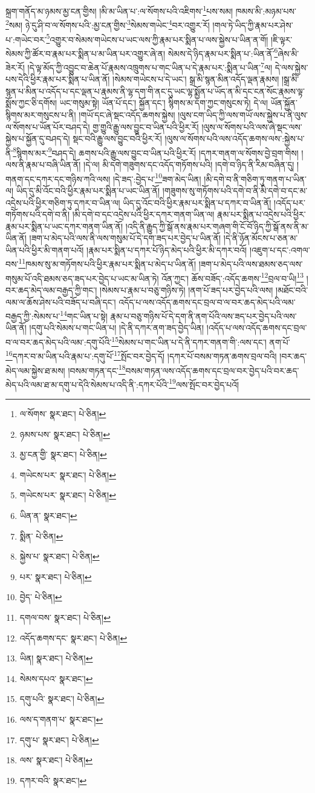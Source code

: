 སྐྲག་གནོད་མ་ཉམས་མྱ་ངན་གྱིས། །མི་མ་ཡིན་པ་:ལ་སོགས་པའི་འཇིགས་\footnote{ལ་སོགས་  སྣར་ཐང་།  པེ་ཅིན། }པས་སམ། ཁམས་མི་:མཉམ་པས་\footnote{ཉམས་པས་  སྣར་ཐང་།  པེ་ཅིན། }སམ། ཉེ་དུ་ཤི་བ་ལ་སོགས་པའི་:མྱ་ངན་གྱིས་\footnote{མྱ་ངན་གྱི་  སྣར་ཐང་།  པེ་ཅིན། }སེམས་གཡེང་\footnote{གཡེངས་པར་  སྣར་ཐང་།  པེ་ཅིན། }བར་འགྱུར་རོ། །གལ་ཏེ་ཡིད་ཀྱི་རྣམ་པར་ཤེས་པ་:གཡེང་བར་\footnote{གཡེངས་པར་  སྣར་ཐང་།  པེ་ཅིན། }འགྱུར་བ་སེམས་གཡེངས་པ་ཡང་ལས་ཀྱི་རྣམ་པར་སྨིན་པ་ལས་སྐྱེས་པ་ཡིན་ན་གོ། །ཇི་ལྟར་སེམས་ཀྱི་ཚོར་བ་རྣམ་པར་སྨིན་པ་མ་ཡིན་པར་འགྱུར་ཞེ་ན། སེམས་དེ་ཉིད་རྣམ་པར་སྨིན་པ་:ཡིན་ནོ་\footnote{ཡིན་ན་  སྣར་ཐང་། }ཞེས་མི་ཟེར་རོ། །དེ་ལྟ་མོད་ཀྱི་འབྱུང་བ་ཆེན་པོ་རྣམས་འཁྲུགས་པ་གང་ཡིན་པ་དེ་རྣམ་པར་:སྨིན་པ་ཡིན་\footnote{སྨིན་  པེ་ཅིན། }ལ། དེ་ལས་སྐྱེས་པས་དེའི་ཕྱིར་རྣམ་པར་སྨིན་པ་ཡིན་ནོ། །སེམས་གཡེངས་པ་དེ་ཡང་། སྒྲ་མི་སྙན་མིན་འདོད་ལྡན་རྣམས། །སྒྲ་མི་སྙན་པ་མིན་པ་འདོད་པ་དང་ལྡན་པ་རྣམས་ནི་ལྷ་དག་གི་ནང་དུ་ཡང་ལྷ་སྨྱོན་པ་ཡོད་ན་མི་དང་ངན་སོང་རྣམས་ལྟ་སྨོས་ཀྱང་ཅི་དགོས། ཡང་གསུམ་སྟེ། ཡོན་པོ་དང་། སྐྱོན་དང་། སྙིགས་མ་དག་ཀྱང་གསུངས་ཏེ། དེ་ལ། ཡོན་སྐྱོན་སྙིགས་མར་གསུངས་པ་ནི། །གཡོ་དང་ཞེ་སྡང་འདོད་ཆགས་སྐྱེས། །ལུས་ངག་ཡིད་ཀྱི་ལས་གཡོ་ལས་སྐྱེས་པ་ནི་ལུས་ལ་སོགས་པ་ཡོན་པོར་བཤད་དེ། གྱ་གྱུའི་རྒྱུ་ལས་བྱུང་བ་ཡིན་པའི་ཕྱིར་རོ། །ལུས་ལ་སོགས་པའི་ལས་ཞེ་སྡང་ལས་སྐྱེས་པ་སྐྱོན་དུ་བཤད་དེ། སྡང་བའི་རྒྱུ་ལས་བྱུང་བའི་ཕྱིར་རོ། །ལུས་ལ་སོགས་པའི་ལས་འདོད་ཆགས་ལས་:སྐྱེས་པ་ནི་\footnote{སྐྱེས་པ་  སྣར་ཐང་།  པེ་ཅིན། }སྙིགས་མར་\footnote{པར་  སྣར་ཐང་།  པེ་ཅིན། }བཤད་དེ། ཆགས་པའི་རྒྱུ་ལས་བྱུང་བ་ཡིན་པའི་ཕྱིར་རོ། །དཀར་གནག་ལ་སོགས་བྱེ་བྲག་གིས། །ལས་ནི་རྣམ་པ་བཞི་ཡིན་ནོ། །དེ་ལ། མི་དགེ་གཟུགས་དང་འདོད་གཏོགས་པའི། །དགེ་བ་ཉིད་ནི་རིམ་བཞིན་དུ། །གནག་དང་དཀར་དང་གཉིས་ཀའི་ལས། །དེ་ཟད་:བྱེད་པ་\footnote{བྱེད་  པེ་ཅིན། }ཟག་མེད་ཡིན། །མི་དགེ་བ་ནི་གཅིག་ཏུ་གནག་པ་ཡིན་ལ། ཡིད་དུ་མི་འོང་བའི་ཕྱིར་རྣམ་པར་སྨིན་པ་ཡང་ཡིན་ནོ། །གཟུགས་སུ་གཏོགས་པའི་དགེ་བ་ནི་མི་དགེ་བ་དང་མ་འདྲེས་པའི་ཕྱིར་གཅིག་ཏུ་དཀར་བ་ཡིན་ལ། ཡིད་དུ་འོང་བའི་ཕྱིར་རྣམ་པར་སྨིན་པ་དཀར་བ་ཡིན་ནོ། །འདོད་པར་གཏོགས་པའི་དགེ་བ་ནི། །མི་དགེ་བ་དང་འདྲེས་པའི་ཕྱིར་དཀར་གནག་ཡིན་ལ། རྣམ་པར་སྨིན་པ་འདྲེས་པའི་ཕྱིར་རྣམ་པར་སྨིན་པ་ཡང་དཀར་གནག་ཡིན་ནོ། །འདི་ནི་རྒྱུད་ཀྱི་སྒོ་ནས་རྣམ་པར་གཞག་གི་ངོ་བོ་ཉིད་ཀྱི་སྒོ་ནས་ནི་མ་ཡིན་ནོ། །ཟག་པ་མེད་པའི་ལས་ནི་ལས་གསུམ་པོ་དེ་དག་ཟད་པར་བྱེད་པ་ཡིན་ནོ། །དེ་ནི་ཉོན་མོངས་པ་ཅན་མ་ཡིན་པའི་ཕྱིར་མི་གནག་པའོ། །རྣམ་པར་སྨིན་པ་དཀར་པོ་ཉིད་མེད་པའི་ཕྱིར་མི་དཀར་བའོ། །འཇུག་པ་དང་:འགལ་བས་\footnote{དགལ་བས་  སྣར་ཐང་།  པེ་ཅིན། }ཁམས་སུ་མ་གཏོགས་པའི་ཕྱིར་རྣམ་པར་སྨིན་པ་མེད་པ་ཡིན་ནོ། །ཟག་པ་མེད་པའི་ལས་ཐམས་ཅད་ལས་གསུམ་པོ་འདི་ཐམས་ཅད་ཟད་པར་བྱེད་པ་ཡང་མ་ཡིན་ཏེ། འོན་ཀྱང་། ཆོས་བཟོད་:འདོད་ཆགས་\footnote{འདོད་ཆགས་དང་  སྣར་ཐང་།  པེ་ཅིན། }བྲལ་བ་ཡི།\footnote{ཡིན།  སྣར་ཐང་།  པེ་ཅིན། } །བར་ཆད་མེད་ལམ་བརྒྱད་ཀྱི་གང་། །སེམས་པ་རྣམ་པ་བཅུ་གཉིས་ཏེ། །ནག་པོ་ཟད་པར་བྱེད་པའི་ལས། །མཐོང་བའི་ལམ་ལ་ཆོས་ཤེས་པའི་བཟོད་པ་བཞི་དང་། འདོད་པ་ལས་འདོད་ཆགས་དང་བྲལ་བ་ལ་བར་ཆད་མེད་པའི་ལམ་བརྒྱད་ཀྱི་:སེམས་པ་\footnote{སེམས་དཔའ་  སྣར་ཐང་། }གང་ཡིན་པ་སྟེ། རྣམ་པ་བཅུ་གཉིས་པོ་དེ་དག་ནི་ནག་པོའི་ལས་ཟད་པར་བྱེད་པའི་ལས་ཡིན་ནོ། །དགུ་པའི་སེམས་པ་གང་ཡིན་པ། །དེ་ནི་དཀར་ནག་ཟད་བྱེད་ཡིན། །འདོད་པ་ལས་འདོད་ཆགས་དང་བྲལ་བ་ལ་བར་ཆད་མེད་པའི་ལམ་:དགུ་པོའི་\footnote{དགུ་པའི་  སྣར་ཐང་།  པེ་ཅིན། }སེམས་པ་གང་ཡིན་པ་དེ་ནི་དཀར་གནག་གི་:ལས་དང་། ནག་པོ་\footnote{ལས་ད་གནག་པ་  སྣར་ཐང་། }དཀར་བ་མ་ཡིན་པའི་རྣམ་པ་:དགུ་པོ་\footnote{དགུ་པ་  སྣར་ཐང་།  པེ་ཅིན། }སྤོང་བར་བྱེད་དོ། །དཀར་པོ་བསམ་གཏན་ཆགས་བྲལ་བའི། །བར་ཆད་མེད་ལམ་སྐྱེས་ཐ་མས། །བསམ་གཏན་དང་\footnote{ལས་  སྣར་ཐང་།  པེ་ཅིན། }བསམ་གཏན་ལས་འདོད་ཆགས་དང་བྲལ་བར་བྱེད་པའི་བར་ཆད་མེད་པའི་ལམ་ཐ་མ་དགུ་པ་དེའི་སེམས་པ་འདི་ནི་:དཀར་པོའི་\footnote{དཀར་བའི་  སྣར་ཐང་། }ལས་སྤོང་བར་བྱེད་པའོ། 